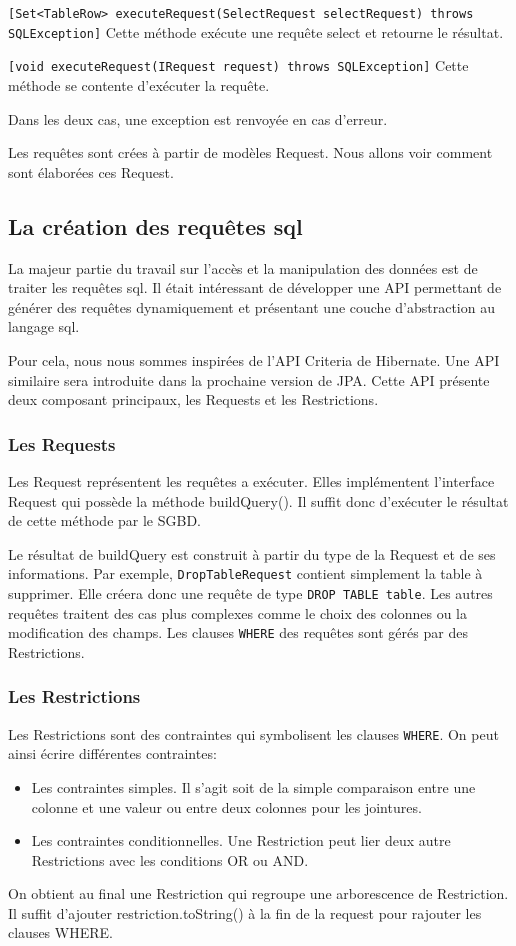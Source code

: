 \texttt{[Set<TableRow> executeRequest(SelectRequest selectRequest) throws SQLException]}
Cette méthode exécute une requête select et retourne le résultat.

\texttt{[void executeRequest(IRequest request) throws SQLException]}
Cette méthode se contente d'exécuter la requête.

Dans les deux cas, une exception est renvoyée en cas d'erreur.

Les requêtes sont crées à partir de modèles Request. Nous allons voir comment sont élaborées ces Request.
\subsection{La création des requêtes sql}
La majeur partie du travail sur l'accès et la manipulation des données est de traiter les requêtes sql. Il était intéressant de développer une API permettant de générer des requêtes dynamiquement et présentant une couche d'abstraction au langage sql.

Pour cela, nous nous sommes inspirées de l'API Criteria de Hibernate. Une API similaire sera introduite dans la prochaine version de JPA. Cette API présente deux composant principaux, les Requests et les Restrictions.
\subsubsection{Les Requests}
Les Request représentent les requêtes a exécuter. Elles implémentent l'interface Request qui possède la méthode buildQuery(). Il suffit donc d'exécuter le résultat de cette méthode par le SGBD.

Le résultat de buildQuery est construit à partir du type de la Request et de ses informations. Par exemple, \texttt{DropTableRequest} contient simplement la table à supprimer. Elle créera donc une requête de type \texttt{DROP TABLE table}. Les autres requêtes traitent des cas plus complexes comme le choix des colonnes ou la modification des champs. 
Les clauses \texttt{WHERE} des requêtes sont gérés par des Restrictions.
\subsubsection{Les Restrictions}
Les Restrictions sont des contraintes qui symbolisent les clauses \texttt{WHERE}. On peut ainsi écrire différentes contraintes:
\begin{itemize}
 \item Les contraintes simples. Il s'agit soit de la simple comparaison entre une colonne et une valeur ou entre deux colonnes pour les jointures.
 \item Les contraintes conditionnelles. Une Restriction peut lier deux autre Restrictions avec les conditions OR ou AND.
\end{itemize}
On obtient au final une Restriction qui regroupe une arborescence de Restriction. Il suffit d'ajouter restriction.toString() à la fin de la request pour rajouter les clauses WHERE. 

